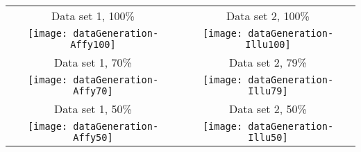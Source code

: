 \documentclass[a4paper,11pt] {article}
\begin{document}
\pagestyle{empty}
  \centering
  \begin{tabular}{cc}
    Data set 1, 100\% & Data set 2, 100\%\\
  \texttt{[image: dataGeneration-Affy100]} &
  \texttt{[image: dataGeneration-Illu100]}\\
    Data set 1, 70\% & Data set 2, 79\%\\
  \texttt{[image: dataGeneration-Affy70]} &
  \texttt{[image: dataGeneration-Illu79]}\\
    Data set 1, 50\% & Data set 2, 50\%\\
  \texttt{[image: dataGeneration-Affy50]} &
  \texttt{[image: dataGeneration-Illu50]}\\
\end{tabular}
\end{document}
